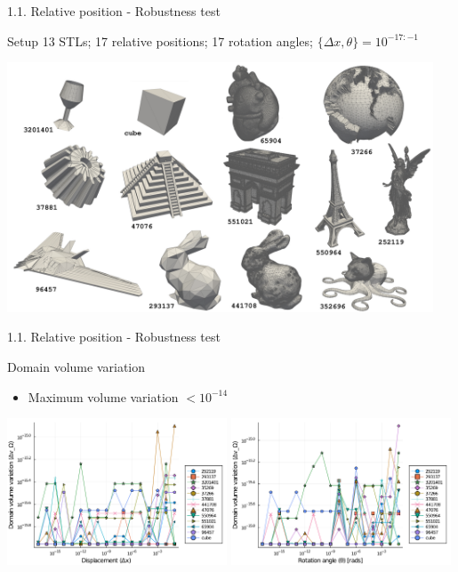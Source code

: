 \documentclass{beamer}
\begin{document}
\begin{frame}{1.1. Relative position - Robustness test}
  \begin{block}{Setup}
    13 STLs; 17 relative positions; 17 rotation angles;  $\{\Delta x, \theta\} = 10^{-17:-1}$
  \end{block}
  \includegraphics[width=0.95\textwidth]{matrix_ids.pdf}
\end{frame}

\begin{frame}{1.1. Relative position - Robustness test}

  \begin{block}{Domain volume variation}
  \begin{itemize}
    \item
      Maximum volume variation $< 10^{-14}$
  \end{itemize}
  \end{block}

  \includegraphics[width=0.49\textwidth]{../analysis/plots/x_displacement_y_domain_volume}
  \includegraphics[width=0.49\textwidth]{../analysis/plots/x_rotation_y_domain_volume}
\end{frame}
\end{document}
